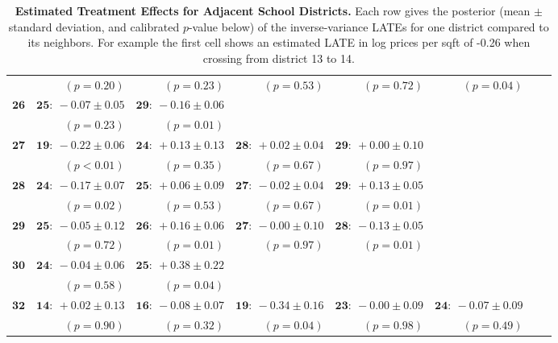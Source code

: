 \begin{landscape}
\begin{table}[p]
\begin{tabular}{r|rrrrrrr}
 & \( (p={0.20}) \)& \( (p={0.23}) \)& \( (p={0.53}) \)& \( (p={0.72}) \)& \( (p={0.04}) \)\\ 
\( \mathbf{26} \) \vspace{-0.7ex} & \( \mathbf{25:}~-0.07 \pm 0.05 \)& \( \mathbf{29:}~-0.16 \pm 0.06 \)\\ 
 & \( (p={0.23}) \)& \( (p={0.01}) \)\\ 
\( \mathbf{27} \) \vspace{-0.7ex} & \( \mathbf{19:}~-0.22 \pm 0.06 \)& \( \mathbf{24:}~+0.13 \pm 0.13 \)& \( \mathbf{28:}~+0.02 \pm 0.04 \)& \( \mathbf{29:}~+0.00 \pm 0.10 \)\\ 
 & \( (p<0.01) \)& \( (p={0.35}) \)& \( (p={0.67}) \)& \( (p={0.97}) \)\\ 
\( \mathbf{28} \) \vspace{-0.7ex} & \( \mathbf{24:}~-0.17 \pm 0.07 \)& \( \mathbf{25:}~+0.06 \pm 0.09 \)& \( \mathbf{27:}~-0.02 \pm 0.04 \)& \( \mathbf{29:}~+0.13 \pm 0.05 \)\\ 
 & \( (p={0.02}) \)& \( (p={0.53}) \)& \( (p={0.67}) \)& \( (p={0.01}) \)\\ 
\( \mathbf{29} \) \vspace{-0.7ex} & \( \mathbf{25:}~-0.05 \pm 0.12 \)& \( \mathbf{26:}~+0.16 \pm 0.06 \)& \( \mathbf{27:}~-0.00 \pm 0.10 \)& \( \mathbf{28:}~-0.13 \pm 0.05 \)\\ 
 & \( (p={0.72}) \)& \( (p={0.01}) \)& \( (p={0.97}) \)& \( (p={0.01}) \)\\ 
\( \mathbf{30} \) \vspace{-0.7ex} & \( \mathbf{24:}~-0.04 \pm 0.06 \)& \( \mathbf{25:}~+0.38 \pm 0.22 \)\\ 
 & \( (p={0.58}) \)& \( (p={0.04}) \)\\ 
\( \mathbf{32} \) \vspace{-0.7ex} & \( \mathbf{14:}~+0.02 \pm 0.13 \)& \( \mathbf{16:}~-0.08 \pm 0.07 \)& \( \mathbf{19:}~-0.34 \pm 0.16 \)& \( \mathbf{23:}~-0.00 \pm 0.09 \)& \( \mathbf{24:}~-0.07 \pm 0.09 \)\\ 
 & \( (p={0.90}) \)& \( (p={0.32}) \)& \( (p={0.04}) \)& \( (p={0.98}) \)& \( (p={0.49}) \)\\ 
            \hline
        \end{tabular}
        \caption{
            \label{table:NYC_pairwise}
            \textbf{Estimated Treatment Effects for Adjacent School Districts.}
            Each row gives the posterior (mean \(\pm\) standard deviation, and calibrated $p$-value below) of the inverse-variance LATEs for one district compared to its neighbors.
            For example the first cell shows an estimated LATE in log prices per sqft of -0.26 when crossing from district 13 to 14.
        }
    \end{table}
\end{landscape}
